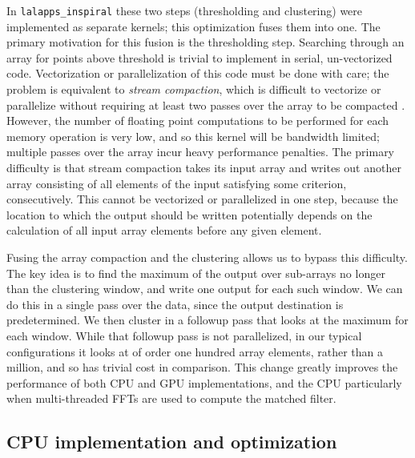 In \texttt{lalapps\_inspiral} these two steps (thresholding and clustering) were
implemented as separate kernels; this optimization fuses them into one.  The
primary motivation for this fusion is the thresholding step.  Searching through
an array for points above threshold is trivial to implement in serial,
un-vectorized code.  Vectorization or
parallelization of this code must be done with care; the problem is 
equivalent to \emph{stream compaction}, which is difficult to vectorize or
parallelize without requiring at least two passes over the array to be compacted
\cite{Billeter:2009:ESC:1572769.1572795}. However, the number of floating point
computations to be performed for each memory operation is very low, and so this
kernel will be bandwidth limited; multiple passes over the array incur heavy
performance penalties. The primary difficulty is that stream compaction takes
its input array and writes out another array consisting of all elements of the
input satisfying some criterion, consecutively.  This cannot be vectorized or
parallelized in one step, because the location to which the output should be
written potentially depends on the calculation of all input array elements
before any given element.

Fusing the array compaction and the clustering allows us to bypass this
difficulty. The key idea is to find the maximum of the output over sub-arrays no
longer than the clustering window, and write one output for each such window.
We can do this in a single pass over the data, since the output destination is
predetermined.  We then cluster in a followup pass that looks at the maximum
for each window.  While that followup pass is not parallelized, in our typical
configurations it looks at of order one hundred array elements, rather than a
million, and so has trivial cost in comparison. This change greatly
improves the performance of both CPU and GPU implementations, and the CPU
particularly when multi-threaded FFTs are used to compute the matched filter. 

\vspace*{-10pt}
\subsection{CPU implementation and optimization}\label{sec:cpu-opt}
\vspace*{-05pt}

